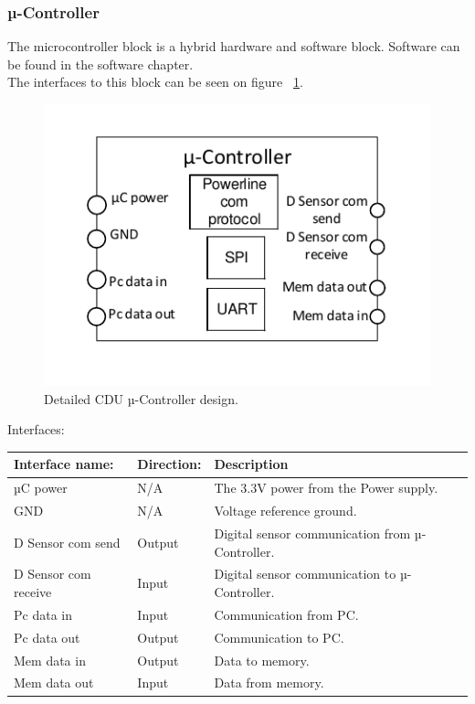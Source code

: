 \subsubsection{µ-Controller}
The microcontroller block is a hybrid hardware and software block. Software can be found in the software chapter.\\
The interfaces to this block can be seen on figure ~\ref{fig:CDUuC}.\\
\begin{figure}[H]
	\centering
	\includegraphics[scale=1]{billeder/CDUuC}
	\caption{Detailed CDU µ-Controller design.}
	\label{fig:CDUuC}
\end{figure}
Interfaces:
\begin{table}[H]
	\centering
	\begin{tabular}{|p{3cm} |p{3cm}| p{8cm}| }
		\hline
		Interface name: & Direction: 	& Description \\ \hline
		µC power	  &N/A & The 3.3V power from the Power supply. \\ \hline
		GND				&N/A & Voltage reference ground. \\\hline 
		D Sensor com send & Output	& Digital sensor communication from µ-Controller. \\\hline 
		D Sensor com receive & Input	& Digital sensor communication to µ-Controller. \\\hline
		Pc data in		&Input & Communication from PC. \\\hline 
		Pc data out		&Output & Communication to PC. \\\hline
		Mem data in		&Output & Data to memory. \\\hline 
		Mem data out	&Input & Data from memory. \\\hline  
	\end{tabular}
\end{table}

